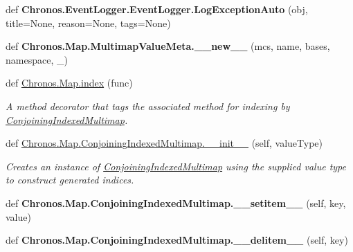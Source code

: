 \begin{DoxyCompactItemize}
\item 
def {\bfseries Chronos.\+Event\+Logger.\+Event\+Logger.\+Log\+Exception\+Auto} (obj, title=None, reason=None, tags=None)\hypertarget{group__PyInfrastructure_gaf3a8f92b8b42c7ab531794d107fd82ac}{}\label{group__PyInfrastructure_gaf3a8f92b8b42c7ab531794d107fd82ac}

\item 
def {\bfseries Chronos.\+Map.\+Multimap\+Value\+Meta.\+\_\+\+\_\+new\+\_\+\+\_\+} (mcs, name, bases, namespace, \+\_\+)\hypertarget{group__PyInfrastructure_ga363105a2832e5cd3e416e58bcc572c50}{}\label{group__PyInfrastructure_ga363105a2832e5cd3e416e58bcc572c50}

\item 
def \hyperlink{group__PyInfrastructure_ga9f969afc54b404a47d37bdf6d5060f10}{Chronos.\+Map.\+index} (func)
\begin{DoxyCompactList}\small\item\em A method decorator that tags the associated method for indexing by \hyperlink{classChronos_1_1Map_1_1ConjoiningIndexedMultimap}{Conjoining\+Indexed\+Multimap}. \end{DoxyCompactList}\item 
def \hyperlink{group__PyInfrastructure_gad33330f697b05ca2d3ecfc6b4e315306}{Chronos.\+Map.\+Conjoining\+Indexed\+Multimap.\+\_\+\+\_\+init\+\_\+\+\_\+} (self, value\+Type)
\begin{DoxyCompactList}\small\item\em Creates an instance of \hyperlink{classChronos_1_1Map_1_1ConjoiningIndexedMultimap}{Conjoining\+Indexed\+Multimap} using the supplied value type to construct generated indices. \end{DoxyCompactList}\item 
def {\bfseries Chronos.\+Map.\+Conjoining\+Indexed\+Multimap.\+\_\+\+\_\+setitem\+\_\+\+\_\+} (self, key, value)\hypertarget{group__PyInfrastructure_ga6fdae277ecc12980168a375638960755}{}\label{group__PyInfrastructure_ga6fdae277ecc12980168a375638960755}

\item 
def {\bfseries Chronos.\+Map.\+Conjoining\+Indexed\+Multimap.\+\_\+\+\_\+delitem\+\_\+\+\_\+} (self, key)\hypertarget{group__PyInfrastructure_ga7445ea5dd6ddbc68bdd15c1a10490029}{}\label{group__PyInfrastructure_ga7445ea5dd6ddbc68bdd15c1a10490029}


\end{DoxyCompactItemize}
